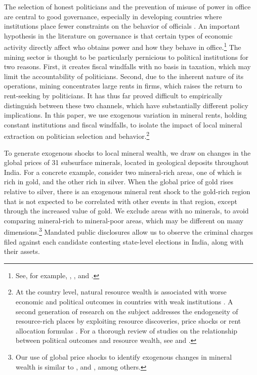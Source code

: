 \documentclass[12pt,letterpaper]{article}
\begin{document}
The selection of honest politicians and the prevention of misuse
of power in office are central to good governance, especially in
developing countries where institutions place fewer constraints on the
behavior of officials \cite{Caselli2004,Besley2011a,DalBo2017}. An
important hypothesis in the literature on governance is that certain
types of economic activity directly affect who obtains power and how
they behave in office.\footnote{See, for example,
  , , and
  .}  The mining sector is
thought to be particularly pernicious to political institutions for
two reasons. First, it creates fiscal windfalls with no basis in
taxation, which may limit the accountability of politicians. Second,
due to the inherent nature of its operations, mining concentrates
large rents in firms, which raises the return to rent-seeking by
politicians. It has thus far proved difficult to empirically
distinguish between these two channels, which have substantially
different policy implications. In this paper, we use exogenous
variation in mineral rents, holding constant institutions and fiscal
windfalls, to isolate the impact of local mineral extraction on
politician selection and behavior.\footnote{At the country level,
  natural resource wealth is associated with worse economic and
  political outcomes in countries with weak institutions
  \cite{Mehlum2006,Arezki2011,Arezki2012,Bhattacharyya2010,Lei2014,Caselli2011}. A
  second generation of research on the subject addresses the
  endogeneity of resource-rich places by exploiting resource
  discoveries, price shocks or rent allocation formulas
  \cite{Bruckner2012,Carreri2014,Caselli2011}. For a thorough review
  of studies on the relationship between political outcomes and
  resource wealth, see  and
  .}

To generate exogenous shocks to local mineral wealth, we draw on
changes in the global prices of 31 subsurface minerals, located in
geological deposits throughout India. For a concrete example, consider
two mineral-rich areas, one of which is rich in gold, and the other
rich in silver. When the global price of gold rises relative to
silver, there is an exogenous mineral rent shock to the gold-rich
region that is not expected to be correlated with other events in that
region, except through the increased value of gold. We exclude areas
with no minerals, to avoid comparing mineral-rich to mineral-poor
areas, which may be different on many dimensions.\footnote{Our use of
  global price shocks to identify exogenous changes in mineral wealth
  is similar to ,  and
  , among others.}  Mandated public disclosures
allow us to observe the criminal charges filed against each candidate
contesting state-level elections in India, along with their assets.
\end{document}
